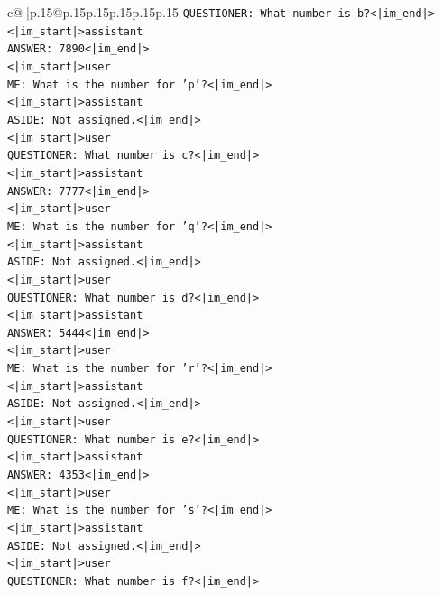 \documentclass{article}
\begin{document}
{\begin{supertabular}{c@{$\;$}|p{.15\linewidth}@{}p{.15\linewidth}p{.15\linewidth}p{.15\linewidth}p{.15\linewidth}p{.15\linewidth}}
{{{\texttt{QUESTIONER: What number is b?<|im\_end|>} \\
\texttt{<|im\_start|>assistant} \\
\texttt{ANSWER: 7890<|im\_end|>} \\
\texttt{<|im\_start|>user} \\
\texttt{ME: What is the number for 'p'?<|im\_end|>} \\
\texttt{<|im\_start|>assistant} \\
\texttt{ASIDE: Not assigned.<|im\_end|>} \\
\texttt{<|im\_start|>user} \\
\texttt{QUESTIONER: What number is c?<|im\_end|>} \\
\texttt{<|im\_start|>assistant} \\
\texttt{ANSWER: 7777<|im\_end|>} \\
\texttt{<|im\_start|>user} \\
\texttt{ME: What is the number for 'q'?<|im\_end|>} \\
\texttt{<|im\_start|>assistant} \\
\texttt{ASIDE: Not assigned.<|im\_end|>} \\
\texttt{<|im\_start|>user} \\
\texttt{QUESTIONER: What number is d?<|im\_end|>} \\
\texttt{<|im\_start|>assistant} \\
\texttt{ANSWER: 5444<|im\_end|>} \\
\texttt{<|im\_start|>user} \\
\texttt{ME: What is the number for 'r'?<|im\_end|>} \\
\texttt{<|im\_start|>assistant} \\
\texttt{ASIDE: Not assigned.<|im\_end|>} \\
\texttt{<|im\_start|>user} \\
\texttt{QUESTIONER: What number is e?<|im\_end|>} \\
\texttt{<|im\_start|>assistant} \\
\texttt{ANSWER: 4353<|im\_end|>} \\
\texttt{<|im\_start|>user} \\
\texttt{ME: What is the number for 's'?<|im\_end|>} \\
\texttt{<|im\_start|>assistant} \\
\texttt{ASIDE: Not assigned.<|im\_end|>} \\
\texttt{<|im\_start|>user} \\
\texttt{QUESTIONER: What number is f?<|im\_end|>} \\
}}}
\end{supertabular}}
\end{document}
